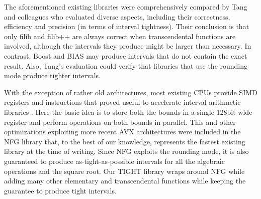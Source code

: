 The aforementioned existing libraries were comprehensively compared by Tang and colleagues \cite{tang2022} who evaluated diverse aspects, including their correctness, efficiency and precision (in terms of interval tightness). Their conclusion is that only filib and filib++ are always correct when transcendental functions are involved, although the intervals they produce might be larger than necessary. In contrast, Boost and BIAS may produce intervals that do not contain the exact result. Also, Tang's evaluation could verify that libraries that use the rounding mode produce tighter intervals.

With the exception of rather old architectures, most existing CPUs provide SIMD registers and instructions that proved useful to accelerate interval arithmetic libraries \cite{lambov}. Here the basic idea is to store both the bounds in a single 128bit-wide register and perform operations on both bounds in parallel. This and other optimizations exploiting more recent AVX architectures were  included in the NFG library \cite{nfg} that, to the best of our knowledge, represents the fastest existing library at the time of writing. Since NFG exploits the rounding mode, it is also guaranteed to produce as-tight-as-possible intervals for all the algebraic operations and the square root. Our TIGHT library wraps around NFG while adding many other elementary and transcendental functions while keeping the guarantee to produce tight intervals.
